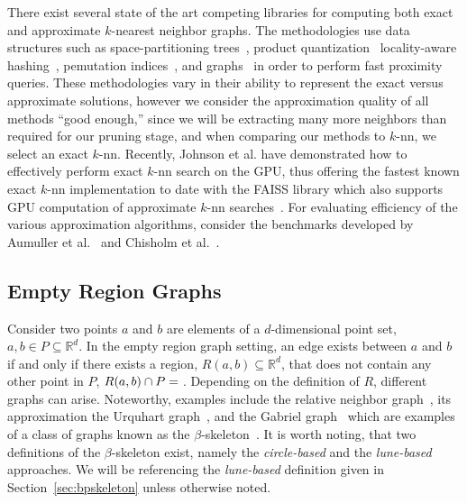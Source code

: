 There exist several state of the art competing libraries for computing both exact and approximate $k$-nearest neighbor graphs.
%
The methodologies use data structures such as space-partitioning trees~\cite{Bentley1975,LiuMooreGray2004,Omohundro1989,Uhlmann1991,Yianilos1993}, product quantization~\cite{BabenkoLempitsky2012,JegouDouzeSchmid2011} locality-aware hashing~\cite{BawaCondieGanesan2005,LvJosephsonWang2007,AndoniIndyk2008,TsaiYang2014,ZhaoLuMei2014}, pemutation indices~\cite{Esuli2012,TellezChavezNavarro2013}, and graphs~\cite{AryaMount1993,DongMosesLi2011,HouleSakuma2005,IwasakiMiyazaki2018,MalkovYashunin2018,SebastianKimia2002,WangLi2012} in order to perform fast proximity queries.
%
These methodologies vary in their ability to represent the exact versus approximate solutions, however we consider the approximation quality of all methods ``good enough,'' since we will be extracting many more neighbors than required for our pruning stage, and when comparing our methods to $k$-nn, we select an exact $k$-nn.
%
Recently, Johnson et al. have demonstrated how to effectively perform exact $k$-nn search on the GPU, thus offering the fastest known exact $k$-nn implementation to date with the FAISS library which also supports GPU computation of approximate $k$-nn searches~\cite{JohnsonDouzeJegou2017}.
%
For evaluating efficiency of the various approximation algorithms, consider the benchmarks developed by Aumuller et al.~\cite{AumullerBernhardssonFaithfull2017} and Chisholm et al.~\cite{ChisholmRichmondMaddock2016}.

\subsection{Empty Region Graphs}
Consider two points $a$ and $b$ are elements of a $d$-dimensional point set, $a,b \in P \subseteq \mathbb{R}^d$.
%
In the empty region graph setting, an edge exists between $a$ and $b$ if and only if there exists a region, $R(a,b) \subseteq \mathbb{R}^d$, that does not contain any other point in $P$, $R(a,b) \cap P = \null$.
%
Depending on the definition of $R$, different graphs can arise.
%
Noteworthy, examples include the relative neighbor graph~\cite{Toussaint1980}, its approximation the Urquhart graph~\cite{Urquhart1980}, and the Gabriel graph~\cite{GabrielSokal1969} which are examples of a class of graphs known as the $\beta$-skeleton~\cite{KirkpatrickRadke1985,JaromczykToussaint1992}.
%
It is worth noting, that two definitions of the $\beta$-skeleton exist, namely the \emph{circle-based} and the \emph{lune-based} approaches.
%
We will be referencing the \emph{lune-based} definition given in Section~\ref{sec:bpskeleton} unless otherwise noted.

